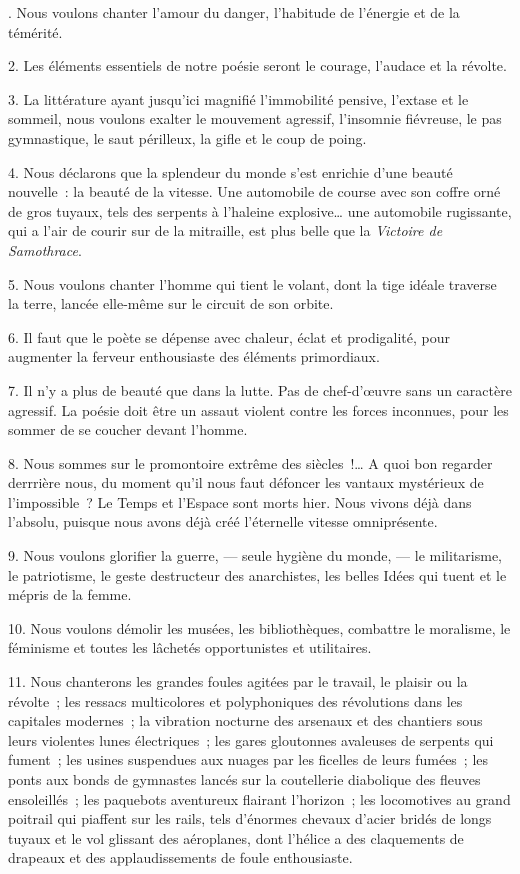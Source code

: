 \documentclass[french,twoside]{book} %
\begin{document}
. Nous voulons chanter l’amour du danger, l’habitude de l’énergie et de la témérité.\par
2. Les éléments essentiels de notre poésie seront le courage, l’audace et la révolte.\par
3. La littérature ayant jusqu’ici magnifié l’immobilité pensive, l’extase et le sommeil, nous voulons exalter le mouvement agressif, l’insomnie fiévreuse, le pas gymnastique, le saut périlleux, la gifle et le coup de poing.\par
4. Nous déclarons que la splendeur du monde s’est enrichie d’une beauté nouvelle : la beauté de la vitesse. Une automobile de course avec son coffre orné de gros tuyaux, tels des serpents à l’haleine explosive… une automobile rugissante, qui a l’air de courir sur de la mitraille, est plus belle que la \emph{Victoire de Samothrace}.\par
5. Nous voulons chanter l’homme qui tient le volant, dont la tige idéale traverse la terre, lancée elle-même sur le circuit de son orbite.\par
6. Il faut que le poète se dépense avec chaleur, éclat et prodigalité, pour augmenter la ferveur enthousiaste des éléments primordiaux.\par
7. Il n’y a plus de beauté que dans la lutte. Pas de chef-d’œuvre sans un caractère agressif. La poésie doit être un assaut violent contre les forces inconnues, pour les sommer de se coucher devant l’homme.\par
8. Nous sommes sur le promontoire extrême des siècles !… A quoi bon regarder derrrière nous, du moment qu’il nous faut défoncer les vantaux mystérieux de l’impossible ? Le Temps et l’Espace sont morts hier. Nous vivons déjà dans l’absolu, puisque nous avons déjà créé l’éternelle vitesse omniprésente.\par
9. Nous voulons glorifier la guerre, — seule hygiène du monde, — le militarisme, le patriotisme, le geste destructeur des anarchistes, les belles Idées qui tuent et le mépris de la femme.\par
10. Nous voulons démolir les musées, les bibliothèques, combattre le moralisme, le féminisme et toutes les lâchetés opportunistes et utilitaires.\par
11. Nous chanterons les grandes foules agitées par le travail, le plaisir ou la révolte ; les ressacs multicolores et polyphoniques des révolutions dans les capitales modernes ; la vibration nocturne des arsenaux et des chantiers sous leurs violentes lunes électriques ; les gares gloutonnes avaleuses de serpents qui fument ; les usines suspendues aux nuages par les ficelles de leurs fumées ; les ponts aux bonds de gymnastes lancés sur la coutellerie diabolique des fleuves ensoleillés ; les paquebots aventureux flairant l’horizon ; les locomotives au grand poitrail qui piaffent sur les rails, tels d’énormes chevaux d’acier bridés de longs tuyaux et le vol glissant des aéroplanes, dont l’hélice a des claquements de drapeaux et des applaudissements de foule enthousiaste.\par
\end{document}
